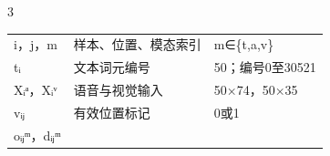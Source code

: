 \begin{PaperTable}{3}
\begin{table}[!htbp]
\begin{tabular}{@{}lll@{}}
\begin{minipage}[t]{\dimexpr 0.230000\linewidth-0.920000\tabcolsep\relax}\raggedright
i，j，m\strut
\end{minipage} & \begin{minipage}[t]{\dimexpr 0.440000\linewidth-1.760000\tabcolsep\relax}\raggedright
样本、位置、模态索引\strut
\end{minipage} & \begin{minipage}[t]{\dimexpr 0.330000\linewidth-1.320000\tabcolsep\relax}\raggedright
m∈\{t,a,v\}\strut
\end{minipage}\tabularnewline
\begin{minipage}[t]{\dimexpr 0.230000\linewidth-0.920000\tabcolsep\relax}\raggedright
tᵢ\strut
\end{minipage} & \begin{minipage}[t]{\dimexpr 0.440000\linewidth-1.760000\tabcolsep\relax}\raggedright
文本词元编号\strut
\end{minipage} & \begin{minipage}[t]{\dimexpr 0.330000\linewidth-1.320000\tabcolsep\relax}\raggedright
50；编号0至30521\strut
\end{minipage}\tabularnewline
\begin{minipage}[t]{\dimexpr 0.230000\linewidth-0.920000\tabcolsep\relax}\raggedright
Xᵢᵃ，Xᵢᵛ\strut
\end{minipage} & \begin{minipage}[t]{\dimexpr 0.440000\linewidth-1.760000\tabcolsep\relax}\raggedright
语音与视觉输入\strut
\end{minipage} & \begin{minipage}[t]{\dimexpr 0.330000\linewidth-1.320000\tabcolsep\relax}\raggedright
50×74，50×35\strut
\end{minipage}\tabularnewline
\begin{minipage}[t]{\dimexpr 0.230000\linewidth-0.920000\tabcolsep\relax}\raggedright
vᵢⱼ\strut
\end{minipage} & \begin{minipage}[t]{\dimexpr 0.440000\linewidth-1.760000\tabcolsep\relax}\raggedright
有效位置标记\strut
\end{minipage} & \begin{minipage}[t]{\dimexpr 0.330000\linewidth-1.320000\tabcolsep\relax}\raggedright
0或1\strut
\end{minipage}\tabularnewline
\begin{minipage}[t]{\dimexpr 0.230000\linewidth-0.920000\tabcolsep\relax}\raggedright
oᵢⱼᵐ，dᵢⱼᵐ\strut
\end{minipage} & \begin{minipage}[t]{\dimexpr 0.440000\linewidth-1.760000\tabcolsep\relax}\raggedright

\end{minipage}
\end{tabular}
\end{table}
\end{PaperTable}
